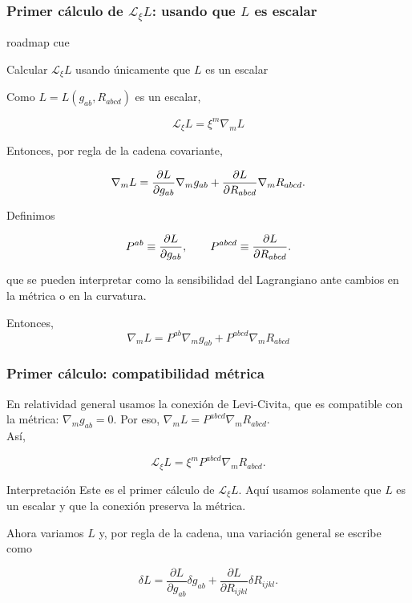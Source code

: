 \documentclass{beamer}
\newcommand{\Lie}{\mathcal{L}}
\newcommand{\RoadmapCue}[1]{%
    \begin{beamercolorbox}[
        wd=\textwidth,
        sep=.55ex,
        leftskip=.8ex,
        rounded=true
    ]{roadmap cue}

    \scriptsize
    \enspace #1

    \end{beamercolorbox}

    \vspace{.25em}
}
\begin{document}
\begin{frame}[label=nav-frame-005]
\frametitle{Primer cálculo de $\Lie_\xi L$: usando que $L$ es escalar}
\RoadmapCue{
Calcular $\Lie_\xi L$ usando únicamente que $L$ es un escalar
}
\small

Como $L=L(g_{ab},R_{abcd})$ es un escalar,

\[\Lie_\xi L=\xi^m\nabla_m L\]

Entonces, por regla de la cadena covariante,

\[
\nabla_mL
=
\pdv{L}{g_{ab}}\nabla_mg_{ab}
+
\pdv{L}{R_{abcd}}\nabla_mR_{abcd}.
\]

Definimos

\begin{equation}
P^{ab}\equiv \pdv{L}{g_{ab}},
\qquad
P^{abcd}\equiv \pdv{L}{R_{abcd}}.
\label{eq:def-P}
\end{equation}

que se pueden interpretar como la sensibilidad del Lagrangiano ante cambios en la métrica o en la curvatura.

Entonces, \[\nabla_mL=P^{ab}\nabla_mg_{ab}+P^{abcd}\nabla_mR_{abcd}\]

\end{frame}

\begin{frame}[label=nav-frame-006]
\frametitle{Primer cálculo: compatibilidad métrica}
\small

En relatividad general usamos la conexión de Levi-Civita, que es compatible con la métrica: $\nabla_mg_{ab}=0$. Por eso, $\nabla_mL=P^{abcd}\nabla_mR_{abcd}$.\\

Así,

\begin{equation}
\boxed{
\Lie_\xi L
=
\xi^mP^{abcd}\nabla_mR_{abcd}.
}
\label{eq:lie-L-primer-calculo}
\end{equation}

\begin{block}{Interpretación}
Este es el primer cálculo de $\Lie_\xi L$. Aquí usamos solamente que $L$ es un escalar y que la conexión preserva la métrica.
\end{block}

Ahora variamos $L$ y, por regla de la cadena, una variación general se escribe como

\[
\delta L
=
\frac{\partial L}{\partial g_{ab}}\delta g_{ab}
+
\frac{\partial L}{\partial R_{ijkl}}\delta R_{ijkl}.
\]

\end{frame}
\end{document}
